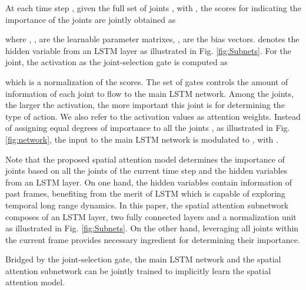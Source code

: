\documentclass[letterpaper]{article}
\begin{document}
At each time step , given the full set of  joints , with , the scores  for indicating the importance of the  joints are jointly obtained as

where , ,  are the learnable parameter matrixes, ,  are the bias vectors.  denotes the hidden variable from an LSTM layer as illustrated in Fig. \ref{fig:Subnets}. For the  joint, the activation as the joint-selection gate is computed as

which is a normalization of the scores. The set of gates controls the amount of information of each joint to flow to the main LSTM network. Among the joints, the larger the activation, the more important this joint is for determining the type of action. We also refer to the activation values as attention weights. Instead of assigning equal degrees of importance to all the joints , as illustrated in Fig. \ref{fig:network}, the input to the main LSTM network is modulated to , with .
\begin{comment}

\end{comment}

Note that the proposed spatial attention model determines the importance of joints based on all the joints of the current time step and the hidden variables from an LSTM layer. On one hand, the hidden variables  contain information of past frames, benefiting from the merit of LSTM which is capable of exploring temporal long range dynamics. In this paper, the spatial attention subnetwork composes of an LSTM layer, two fully connected layers and a normalization unit as illustrated in Fig. \ref{fig:Subnets}. On the other hand, leveraging all joints within the current frame provides necessary ingredient for determining their importance.


Bridged by the joint-selection gate, the main LSTM network and the spatial attention subnetwork can be jointly trained to implicitly learn the spatial attention model.



\begin{comment}
In this paper, we propose spatial attention model to automatically explore and exploit the importances of joints for each skeleton frame. With a soft attention mechanism, each joint within a frame is allocated to a spatial attention weight based on the soft joint-selection gates, which allows our model to focus more on those discriminative joints at each frame corresponding to that action. Thus, at each time step , given the full set of  joints within one frame , the weighted input  is computed:

where  is the sequence of spatial attention weight,  is element-wise multiplication. Considering the current skeleton context  and the memorized information from the hidden state  of the last time step, the weights can be computed as:



where  is jointly trained with all the other parameters of the neural network and  is obtained through feed-forward layers. The spatial attention  represents the importance of  joint , which can be thought of how active our model believes the joint is in the current frame at time .
\end{comment}
\end{document}
